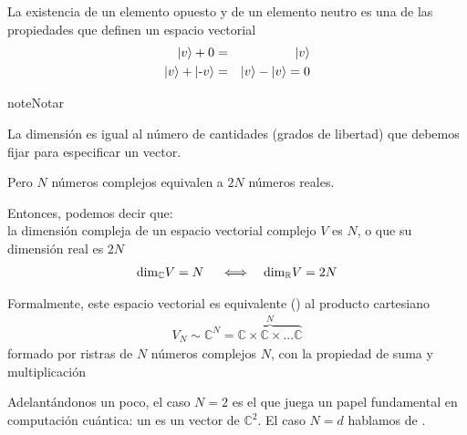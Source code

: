 \documentclass[letterpaper,10pt,english]{jupyterBook}
\newcommand{\ket}[1]{|#1\rangle}
\newcommand{\V}{{ V}}
\begin{document}
\sphinxAtStartPar
La existencia de un elemento opuesto y de un elemento neutro es una de las propiedades que definen un espacio vectorial
\begin{eqnarray*}
\ket{v} + 0 &=& \ket{v} \nonumber\\
\ket{v} + \ket{\hbox{-}v} &=& \ket{v}-\ket{v} = 0 \nonumber\\
\end{eqnarray*}
\begin{sphinxadmonition}{note}{Notar}

\sphinxAtStartPar
La dimensión es igual al número de cantidades (grados de libertad) que debemos fijar para especificar un vector.

\sphinxAtStartPar
Pero \(N\) números complejos equivalen a \(2N\) números reales.

\sphinxAtStartPar
Entonces, podemos decir que:\\
la dimensión compleja de un espacio vectorial complejo  \(\V\) es \(N\), o que su dimensión real es \(2N\)
\begin{equation*}
\begin{split}
{\rm dim}_{\mathbb C} \V = N ~~~~\Longleftrightarrow ~~~   {\rm dim}_{\mathbb R} \V = 2N 
\end{split}
\end{equation*}\end{sphinxadmonition}

\sphinxAtStartPar
Formalmente, este espacio vectorial es equivalente () al producto cartesiano
\begin{equation*}
\begin{split}
\V_N \sim {\mathbb C}^N = \overbrace{{\mathbb C}\times{\mathbb C}\times...{\mathbb C}}^{N}
\end{split}
\end{equation*}
\sphinxAtStartPar
formado por ristras de \(N\) números complejos \(N\), con la propiedad de suma y multiplicación

\sphinxAtStartPar
Adelantándonos un poco, el caso \(N=2\) es el que juega un papel fundamental en computación cuántica: un  es un vector de \({\mathbb C}^2\). El caso \(N=d\) hablamos de .
\end{document}
